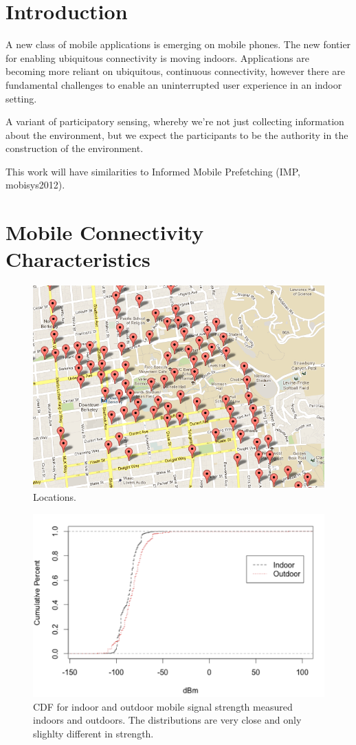 \section{Introduction}
A new class of mobile applications is emerging on mobile phones.  The new fontier for enabling ubiquitous
connectivity is moving indoors.  Applications are becoming more reliant on ubiquitous, continuous connectivity, 
however there are fundamental challenges to enable an uninterrupted user experience in an indoor setting.

A variant of participatory sensing, whereby we're not just collecting information about the environment, but
we expect the participants to be the authority in the construction of the environment.


This work will have similarities to Informed Mobile Prefetching (IMP, mobisys2012).

\section{Mobile Connectivity Characteristics}

\begin{figure}[htbp] %
\centering
\includegraphics[width=0.9\columnwidth]{figs/Locations}
\caption{Locations.}
\label{fig:sdh_power}
\end{figure}

\begin{figure}[htbp] %
\centering
\includegraphics[width=0.9\columnwidth]{figs/indoor_outdoor_cdf}
\caption{CDF for indoor and outdoor mobile signal strength measured indoors and outdoors.  The distributions
are very close and only slighlty different in strength.}
\label{fig:sdh_power}
\end{figure}

